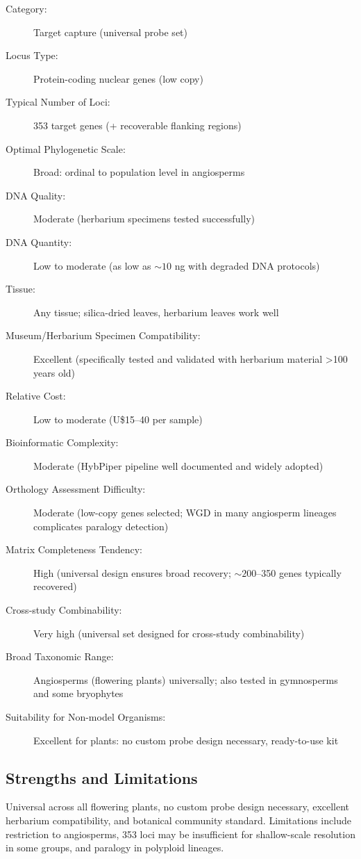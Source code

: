 \begin{description}
\item[Category:] Target capture (universal probe set)
\item[Locus Type:] Protein-coding nuclear genes (low copy)
\item[Typical Number of Loci:] 353 target genes (+ recoverable flanking regions)
\item[Optimal Phylogenetic Scale:] Broad: ordinal to population level in angiosperms
\item[DNA Quality:] Moderate (herbarium specimens tested successfully)
\item[DNA Quantity:] Low to moderate (as low as \(\sim 10\) ng with degraded DNA protocols)
\item[Tissue:] Any tissue; silica-dried leaves, herbarium leaves work well
\item[Museum/Herbarium Specimen Compatibility:] Excellent (specifically tested and validated with herbarium material >100 years old)
\item[Relative Cost:] Low to moderate (U\$15--40 per sample)
\item[Bioinformatic Complexity:] Moderate (HybPiper pipeline well documented and widely adopted)
\item[Orthology Assessment Difficulty:] Moderate (low-copy genes selected; WGD in many angiosperm lineages complicates paralogy detection)
\item[Matrix Completeness Tendency:] High (universal design ensures broad recovery; \(\sim 200\)--350 genes typically recovered)
\item[Cross-study Combinability:] Very high (universal set designed for cross-study combinability)
\item[Broad Taxonomic Range:] Angiosperms (flowering plants) universally; also tested in gymnosperms and some bryophytes
\item[Suitability for Non-model Organisms:] Excellent for plants: no custom probe design necessary, ready-to-use kit
\end{description}

\subsection{Strengths and Limitations}

Universal across all flowering plants, no custom probe design necessary, excellent herbarium compatibility, and botanical community standard. Limitations include restriction to angiosperms, 353 loci may be insufficient for shallow-scale resolution in some groups, and paralogy in polyploid lineages.

